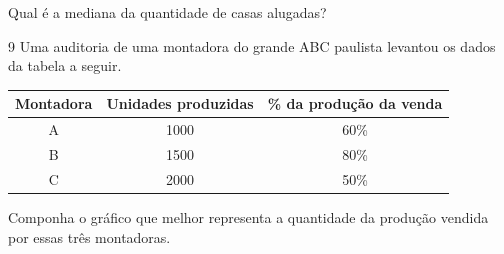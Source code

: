 Qual é a mediana da quantidade de casas alugadas?


\num{9} Uma auditoria de uma montadora do grande ABC paulista levantou os dados 
da tabela a seguir.

\begin{center}
\begin{tabular}{c|c|c}
\hline
\multicolumn{1}{|c|}{\textbf{Montadora}} & \textbf{Unidades produzidas} & \multicolumn{1}{c|}{\textbf{\% da produção da venda}} \\ \hline
A & 1000 & 60\% \\ \hline
B & 1500 & 80\% \\ \hline
C & 2000 & 50\% \\ \hline
\end{tabular}
\end{center}
\enlargethispage{3\baselineskip}

Componha o gráfico que melhor representa a quantidade da produção vendida por
essas três montadoras.


